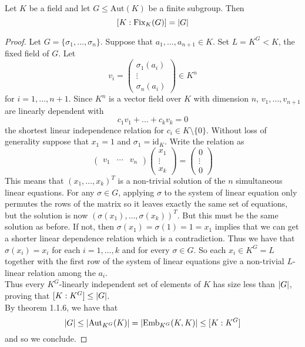 \documentclass[a4paper]{article}
\begin{document}
\begin{prp}{}{} Let $K$ be a field and let $G\leq\text{Aut}(K)$ be a finite subgroup. Then $$[K:\text{Fix}_K(G)]=\abs{G}$$ 
\begin{proof}
Let $G=\{\sigma_1,\dots,\sigma_n\}$. Suppose that $a_1,\dots,a_{n+1}\in K$. Set $L=K^G<K$, the fixed field of $G$. Let $$v_i=\begin{pmatrix}
\sigma_1(a_i)\\
\vdots\\
\sigma_n(a_i)
\end{pmatrix}\in K^n$$ for $i=1,\dots,n+1$. Since $K^n$ is a vector field over $K$ with dimension $n$, $v_1,\dots,v_{n+1}$ are linearly dependent with $$c_1v_1+\dots+c_kv_k=0$$ the shortest linear independence relation for $c_i\in K\setminus\{0\}$. Without loss of generality suppose that $x_1=1$ and $\sigma_1=\text{id}_K$. Write the relation as $$\begin{pmatrix}
v_1 & \cdots & v_n
\end{pmatrix}\begin{pmatrix}
x_1\\\vdots\\x_k
\end{pmatrix}=\begin{pmatrix}
0\\
\vdots\\
0
\end{pmatrix}$$ This means that $(x_1,\dots,x_k)^T$ is a non-trivial solution of the $n$ simultaneous linear equations. For any $\sigma\in G$, applying $\sigma$ to the system of linear equation only permutes the rows of the matrix so it leaves exactly the same set of equations, but the solution is now $(\sigma(x_1),\dots,\sigma(x_k))^T$. But this must be the same solution as before. If not, then $\sigma(x_1)=\sigma(1)=1=x_1$ implies that we can get a shorter linear dependence relation which is a contradiction. Thus we have that $\sigma(x_i)=x_i$ for each $i=1,\dots,k$ and for every $\sigma\in G$. So each $x_i\in K^G=L$ together with the first row of the system of linear equations give a non-trivial $L$-linear relation among the $a_i$. \\

Thus every $K^G$-linearly independent set of elements of $K$ has size less than $\abs{G}$, proving that $[K:K^G]\leq\abs{G}$. \\

By theorem 1.1.6, we have that $$\abs{G}\leq\abs{\text{Aut}_{K^G}(K)}=\abs{\text{Emb}_{K^G}(K,K)}\leq[K:K^G]$$ and so we conclude. 
\end{proof}
\end{prp}
\end{document}
